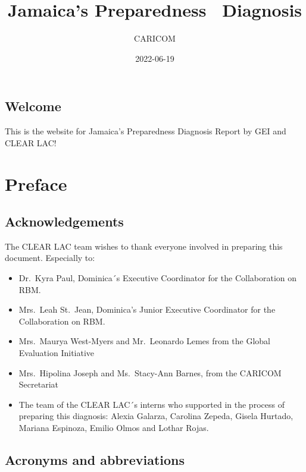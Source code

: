 \documentclass[
  10pt,
]{book}
\title{Jamaica's Preparedness ~Diagnosis}
\author{CARICOM}
\date{2022-06-19}
\begin{document}
\maketitle

{
\setcounter{tocdepth}{1}
\tableofcontents
}
\hypertarget{welcome}{%
\chapter*{Welcome}\label{welcome}}

This is the website for Jamaica's Preparedness Diagnosis Report by GEI and CLEAR LAC!

\hypertarget{part-preface}{%
\part{Preface}\label{part-preface}}

\hypertarget{acknowledgements}{%
\chapter*{Acknowledgements}\label{acknowledgements}}

The CLEAR LAC team wishes to thank everyone involved in preparing this document. Especially to:

\begin{itemize}
\item
  Dr.~Kyra Paul, Dominica´s Executive Coordinator for the Collaboration on RBM.
\item
  Mrs.~Leah St.~Jean, Dominica's Junior Executive Coordinator for the Collaboration on RBM.
\item
  Mrs.~Maurya West-Myers and Mr.~Leonardo Lemes from the Global Evaluation Initiative
\item
  Mrs.~Hipolina Joseph and Ms.~Stacy-Ann Barnes, from the CARICOM Secretariat
\item
  The team of the CLEAR LAC´s interns who supported in the process of preparing this diagnosis: Alexia Galarza, Carolina Zepeda, Gisela Hurtado, Mariana Espinoza, Emilio Olmos and Lothar Rojas.
\end{itemize}

\hypertarget{acronyms-and-abbreviations}{%
\chapter*{Acronyms and abbreviations}\label{acronyms-and-abbreviations}}
\end{document}
